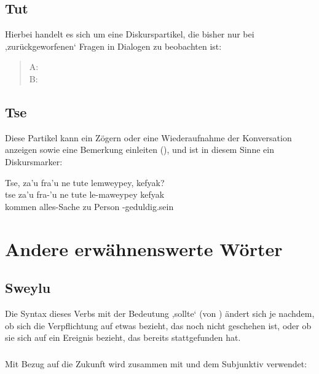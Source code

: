 \subsection{Tut} Hierbei handelt es sich um eine Diskurspartikel, die bisher nur bei ,zurückgeworfenen‘ Fragen in Dialogen zu beobachten ist:

\begin{quotation}
	\noindent A:   \\
	\noindent B:  
\end{quotation}

\subsection{Tse} Diese Partikel kann ein Zögern oder eine Wiederaufnahme der Konversation anzeigen sowie eine Bemerkung einleiten (), und ist in diesem Sinne ein Diskursmarker:

\begin{interlin}
	\glll \Npawl{}Tse, za'u fra'u ne tute lemweypey, kefyak? \\
	tse za'u fra-'u ne tute le-maweypey kefyak \\
	 kommen alles-Sache zu Person -geduldig.sein  \\
\end{interlin}

\section{Andere erwähnenswerte Wörter}

\subsection{Sweylu} \label{syn:sweylu} Die Syntax dieses Verbs mit der Bedeutung ,sollte‘ (von  ) ändert sich je nachdem, ob sich die Verpflichtung auf etwas bezieht, das noch nicht geschehen ist, oder ob sie sich auf ein Ereignis bezieht, das bereits stattgefunden hat.

\subsubsection{} Mit Bezug auf die Zukunft wird  zusammen mit  und dem Subjunktiv verwendet:

